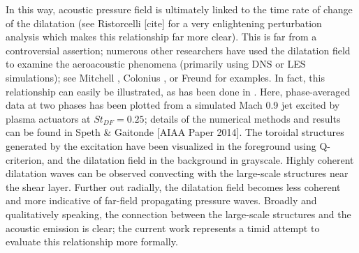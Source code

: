 In this way, acoustic pressure field is ultimately linked to the time rate of change of the dilatation (see Ristorcelli [cite] for a very enlightening perturbation analysis which makes this relationship far more clear).
This is far from a controversial assertion; numerous other researchers have used the dilatation field to examine the aeroacoustic phenomena (primarily using DNS or LES simulations); see Mitchell \etal [cite 1995], Colonius \etal [cite 1997], or Freund \etal [cite 2000] for examples.
In fact, this relationship can easily be illustrated, as has been done in . 
Here, phase-averaged data at two phases has been plotted from a simulated Mach 0.9 jet excited by plasma actuators at $St_{DF} = 0.25$; details of the numerical methods and results can be found in Speth \& Gaitonde [AIAA Paper 2014]. 
The toroidal structures generated by the excitation have been visualized in the foreground using Q-criterion, and the dilatation field in the background in grayscale.
Highly coherent dilatation waves can be observed convecting with the large-scale structures near the shear layer. 
Further out radially, the dilatation field becomes less coherent and more indicative of far-field propagating pressure waves.
Broadly and qualitatively speaking, the connection between the large-scale structures and the acoustic emission is clear; the current work represents a timid attempt to evaluate this relationship more formally.
